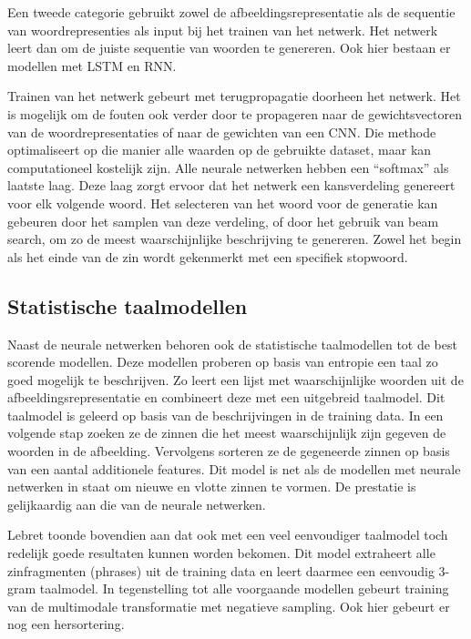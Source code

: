 Een tweede categorie gebruikt zowel de afbeeldingsrepresentatie als de sequentie van 
woordrepresenties als input bij het trainen van het netwerk. Het netwerk leert dan om de juiste sequentie van woorden te genereren. Ook hier bestaan er modellen met LSTM \cite{Donahue2015,Google} en RNN\cite{Karpathy2015}. 

Trainen van het netwerk gebeurt met terugpropagatie doorheen het netwerk. Het is mogelijk om de fouten ook verder door te propageren naar de gewichtsvectoren van de woordrepresentaties of naar de gewichten van een CNN. Die methode optimaliseert op die manier alle waarden op de gebruikte dataset, maar kan computationeel kostelijk zijn.
Alle neurale netwerken hebben een ``softmax'' als laatste laag. Deze laag zorgt ervoor dat het netwerk een kansverdeling genereert voor elk volgende woord. 
Het selecteren van het woord voor de generatie kan gebeuren door het samplen van deze verdeling, of door het gebruik van beam search, om zo de meest waarschijnlijke beschrijving te genereren.  Zowel het begin als het einde van de zin wordt gekenmerkt met een specifiek stopwoord.

\subsection{Statistische taalmodellen}
Naast de neurale netwerken behoren ook de statistische taalmodellen tot de best scorende modellen.
Deze modellen proberen op basis van entropie een taal zo goed mogelijk te beschrijven. Zo leert \cite{Mitchell2015} een lijst met waarschijnlijke woorden uit de afbeeldingsrepresentatie en combineert deze met een uitgebreid taalmodel. Dit taalmodel is geleerd op basis van de beschrijvingen in de training data. In een volgende stap zoeken ze de zinnen die het meest waarschijnlijk zijn gegeven de woorden in de afbeelding. Vervolgens sorteren ze de gegeneerde zinnen op basis van een aantal additionele features. Dit model is net als de modellen met neurale netwerken in staat om nieuwe en vlotte zinnen te vormen. De prestatie is gelijkaardig aan die van de neurale netwerken.

Lebret \cite{Lebret2015} toonde bovendien aan dat ook met een veel eenvoudiger taalmodel toch redelijk goede resultaten kunnen worden bekomen. Dit model extraheert alle zinfragmenten (phrases) uit de training data en leert daarmee een eenvoudig 3-gram taalmodel. In tegenstelling tot alle voorgaande modellen gebeurt training van de multimodale transformatie met negatieve sampling.  Ook hier gebeurt er nog een hersortering.

